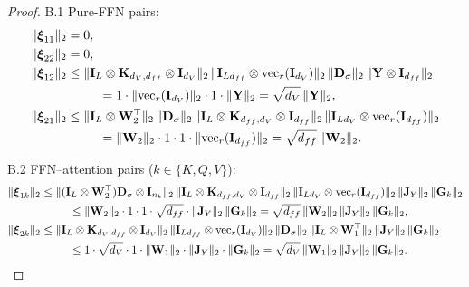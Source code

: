 \documentclass{article}
\begin{document}
\begin{proof}
B.1 Pure-FFN pairs:
\begin{align}
&\|\boldsymbol{\xi}_{11}\|_2 = 0, \qquad  \label{eq:xi11}\\
&\|\boldsymbol{\xi}_{22}\|_2 = 0, \qquad \label{eq:xi22}\\
&\|\boldsymbol{\xi}_{12}\|_2
\le \|\mathbf{I}_L \otimes \mathbf{K}_{d_V, d_{ff}} \otimes \mathbf{I}_{d_V}\|_2 \, \|\mathbf{I}_{L d_{ff}} \otimes \mathrm{vec}_r(\mathbf{I}_{d_V})\|_2 \, \|\mathbf{D}_\sigma\|_2 \, \|\mathbf{Y}\otimes \mathbf{I}_{d_{ff}}\|_2 \nonumber\\
&\hspace{1.9cm}= 1 \cdot \|\mathrm{vec}_r(\mathbf{I}_{d_V})\|_2 \cdot 1 \cdot \|\mathbf{Y}\|_2
= \sqrt{d_V} \,\|\mathbf{Y}\|_2, \label{eq:xi12}\\
&\|\boldsymbol{\xi}_{21}\|_2
\le \|\mathbf{I}_L \otimes \mathbf{W}_2^\top\|_2 \, \|\mathbf{D}_\sigma\|_2 \, \|\mathbf{I}_L \otimes \mathbf{K}_{d_{ff}, d_V} \otimes \mathbf{I}_{d_{ff}}\|_2 \, \|\mathbf{I}_{L d_V} \otimes \mathrm{vec}_r(\mathbf{I}_{d_{ff}})\|_2 \nonumber\\
&\hspace{1.9cm}= \|\mathbf{W}_2\|_2 \cdot 1 \cdot 1 \cdot \|\mathrm{vec}_r(\mathbf{I}_{d_{ff}})\|_2
= \sqrt{d_{ff}} \,\|\mathbf{W}_2\|_2. \label{eq:xi21}
\end{align}

B.2 FFN–attention pairs ($k\in\{K,Q,V\}$):
\begin{align}
&\|\boldsymbol{\xi}_{1k}\|_2
\le \|(\mathbf{I}_L \otimes \mathbf{W}_2^\top)\mathbf{D}_\sigma \otimes \mathbf{I}_{n_k}\|_2
\, \|\mathbf{I}_L \otimes \mathbf{K}_{d_{ff}, d_V} \otimes \mathbf{I}_{d_{ff}}\|_2
\, \|\mathbf{I}_{L d_V} \otimes \mathrm{vec}_r(\mathbf{I}_{d_{ff}})\|_2
\, \|\mathbf{J}_Y\|_2 \,\|\mathbf{G}_k\|_2 \nonumber\\
&\hspace{1.9cm}\le \|\mathbf{W}_2\|_2 \cdot 1 \cdot 1 \cdot \sqrt{d_{ff}} \cdot \|\mathbf{J}_Y\|_2 \,\|\mathbf{G}_k\|_2
= \sqrt{d_{ff}}\, \|\mathbf{W}_2\|_2 \,\|\mathbf{J}_Y\|_2 \,\|\mathbf{G}_k\|_2, \label{eq:xi1k}\\
&\|\boldsymbol{\xi}_{2k}\|_2
\le \|\mathbf{I}_L \otimes \mathbf{K}_{d_V, d_{ff}} \otimes \mathbf{I}_{d_V}\|_2
\, \|\mathbf{I}_{L d_{ff}} \otimes \mathrm{vec}_r(\mathbf{I}_{d_V})\|_2
\, \|\mathbf{D}_\sigma\|_2 \, \|\mathbf{I}_L \otimes \mathbf{W}_1^\top\|_2 \,\|\mathbf{J}_Y\|_2 \,\|\mathbf{G}_k\|_2 \nonumber\\
&\hspace{1.9cm}\le 1 \cdot \sqrt{d_V} \cdot 1 \cdot \|\mathbf{W}_1\|_2 \cdot \|\mathbf{J}_Y\|_2 \cdot \|\mathbf{G}_k\|_2
= \sqrt{d_V}\, \|\mathbf{W}_1\|_2 \,\|\mathbf{J}_Y\|_2 \,\|\mathbf{G}_k\|_2. \label{eq:xi2k}
\end{align}


\end{proof}
\end{document}
